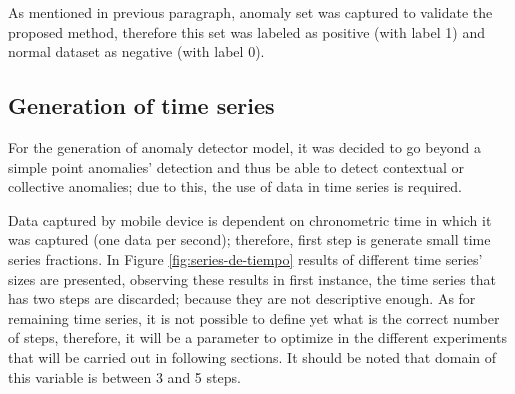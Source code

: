 As mentioned in previous paragraph, anomaly set was captured to validate the proposed method, therefore this set was labeled as positive (with label 1) and normal dataset as negative (with label 0).

\subsection{Generation of time series}

For the generation of anomaly detector model, it was decided to go beyond a simple point anomalies' detection and thus be able to detect contextual or collective anomalies; due to this, the use of data in time series is required.

\vspace{5mm} %

Data captured by mobile device is dependent on chronometric time in which it was captured (one data per second); therefore, first step is generate small time series fractions. In Figure \ref{fig:series-de-tiempo} results of different time series' sizes are presented, observing these results in first instance, the time series that has two steps are discarded; because they are not descriptive enough. As for remaining time series, it is not possible to define yet what is the correct number of steps, therefore, it will be a parameter to optimize in the different experiments that will be carried out in following sections. It should be noted that domain of this variable is between 3 and 5 steps.

